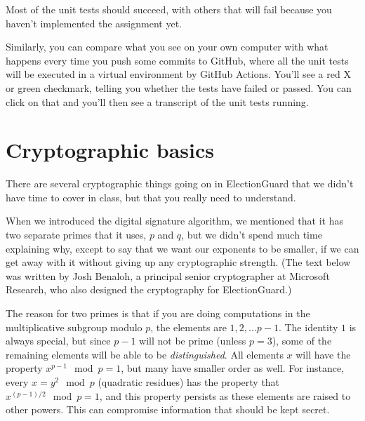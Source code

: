 
Most of the unit tests should succeed, with others that will fail because you haven't
implemented the assignment yet.

Similarly, you can compare what you see on your own computer with
what happens every time you push some commits to GitHub, where all
the unit tests will be executed in a virtual environment
by GitHub Actions. You'll see a red X or green checkmark, telling you
whether the tests have failed or passed. You can click on that
and you'll then see a transcript of the unit tests running.

\section{Cryptographic basics}
There are several cryptographic things going on in ElectionGuard that
we didn't have time to cover in class, but that you really need to
understand.

When we introduced the digital signature algorithm, we mentioned that
it has two separate primes that it uses, $p$ and $q$, but we didn't
spend much time explaining why, except to say that we want our
exponents to be smaller, if we can get away with it without giving up
any cryptographic strength. (The text below was written by 
Josh Benaloh, a principal senior cryptographer at Microsoft Research,
who also designed the cryptography for ElectionGuard.)

The reason for two primes is that if you are doing computations in the
multiplicative subgroup modulo $p$, the elements are ${1,2,\ldots p-1}$. The
identity $1$ is always special, but since $p-1$ will not be prime (unless
$p=3$), some of the remaining elements will be able to be {\em distinguished}.
All elements $x$ will have the property $x^{p-1}\mod p = 1$, but many have
smaller order as well. For instance, every $x=y^2\mod p$ (quadratic
residues) has the property that $x^{(p-1)/2}\mod p = 1$, and this
property persists as these elements are raised to other powers. This
can compromise information that should be kept secret.
 

